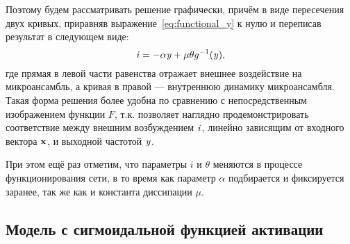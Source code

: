 Поэтому будем рассматривать решение графически, причём в виде пересечения двух кривых, приравняв выражение~\eqref{eq:functional_y} к нулю и переписав результат в следующем виде:
\begin{equation}
    \label{eq:graphic_solution}
    \mathit{i} = - \alpha \mathit{y} + \mu \theta g^{-1}(\mathit{y}),
\end{equation}
где прямая в левой части равенства отражает внешнее воздействие на микроансамбль, а кривая в правой --- внутреннюю динамику микроансамбля. Такая форма решения более удобна по сравнению с непосредственным изображением функции $F$, т.к. позволяет наглядно продемонстрировать соответствие между внешним возбуждением $\mathit{i}$, линейно зависящим от входного вектора $\mathrm{\mathbf{x}}$, и выходной частотой $\mathit{y}$.

При этом ещё раз отметим, что параметры $i$ и $\theta$ меняются в процессе функционирования сети, в то время как параметр $\alpha$ подбирается и фиксируется заранее, так же как и константа диссипации $\mu$.

\subsection{Модель с сигмоидальной функцией активации} \label{subsection:analysis_sigm}

